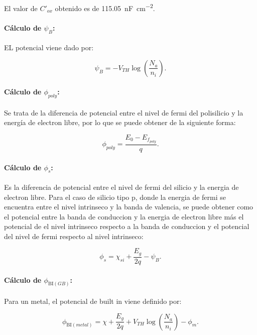 \documentclass[a4paper, twoside, 10pt, spanish]{article}
\numberwithin{table}{section}
\begin{document}
El valor de $C'_{ox}$ obtenido es de \SI{115.05}{\nano\farad\per\centi\metre\squared}.

\paragraph{Cálculo de $\psi_B$:}

EL potencial viene dado por: 

\begin{equation*}
	\psi_B = -V_{TH} \log\left(\frac{N_a}{n_i}\right).
\end{equation*}

\paragraph{Cálculo de $\phi_{poly}$:}

Se trata de la diferencia de potencial entre el nivel de fermi del polisilicio y la energía de electron libre, por lo que se puede obtener de la siguiente forma: 

\begin{equation*}
	\phi_{poly} = \frac{E_0 - E_{f_{poly}}}{q}.
\end{equation*}

\paragraph{Cálculo de $\phi_s$:}

Es la diferencia de potencial entre el nivel de fermi del silicio y la energia de electron libre. Para el caso de silicio tipo p, donde la energia de fermi se encuentra entre el nivel intrinseco y la banda de valencia, se puede obtener como el potencial entre la banda de conduccion y la energia de electron libre más el potencial de el nivel intrinseco respecto a la banda de conduccion y el potencial del nivel de fermi respecto al nivel intrinseco:

\begin{equation*}
	\phi_s = \chi_{si} + \frac{E_g}{2 q} - \psi_B.
\end{equation*}

\paragraph{Cálculo de $\phi_{\mathrm{BI}(GB)}$:}

Para un metal, el potencial de built in viene definido por: 

\begin{equation*}
	\phi_{\mathrm{BI}(metal)} = \chi + \frac{E_g}{2q} + V_{TH} \log\left(\frac{N_a}{n_i}\right) - \phi_m.
\end{equation*}
\end{document}

